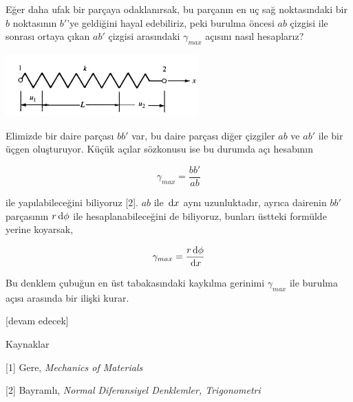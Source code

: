 \documentclass[12pt,fleqn]{article}\usepackage{../../common}
\begin{document}
Eğer daha ufak bir parçaya odaklanırsak, bu parçanın en uç sağ noktasındaki
bir $b$ noktasının $b'$'ye geldiğini hayal edebiliriz, peki burulma öncesi $ab$
çizgisi ile sonrası ortaya çıkan $ab'$ çizgisi arasındaki  $\gamma_{max}$
açısını nasıl hesaplarız? 

\includegraphics[width=20em]{phy_020_strs_06_04.jpg}

Elimizde bir daire parçası $bb'$ var, bu daire parçası diğer çizgiler $ab$
ve $ab'$ ile bir üçgen oluşturuyor. Küçük açılar sözkonusu ise bu durumda
açı hesabının

$$
\gamma_{max} = \frac{bb'}{ab}
$$

ile yapılabileceğini biliyoruz [2]. $ab$ ile $\,\mathrm{d} x$ aynı uzunluktadır,
ayrıca dairenin $bb'$ parçasının $r \,\mathrm{d} \phi$ ile hesaplanabileceğini de
biliyoruz, bunları üstteki formülde yerine koyarsak,

$$
\gamma_{max} = \frac{r \,\mathrm{d} \phi}{\,\mathrm{d} x}
$$

Bu denklem çubuğun en üst tabakasındaki kaykılma gerinimi $\gamma_{max}$
ile burulma açısı arasında bir ilişki kurar.

[devam edecek]

Kaynaklar

[1] Gere, {\em Mechanics of Materials}

[2] Bayramlı, {\em Normal Diferansiyel Denklemler, Trigonometri}
\end{document}

